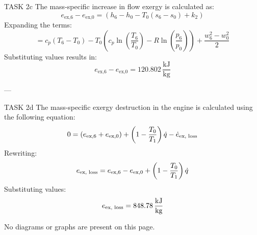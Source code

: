 TASK 2c  
The mass-specific increase in flow exergy is calculated as:  
\[
e_{\text{ex,6}} - e_{\text{ex,0}} = (h_6 - h_0 - T_0(s_6 - s_0) + k_2)
\]  
Expanding the terms:  
\[
= c_p(T_6 - T_0) - T_0 \left( c_p \ln \left( \frac{T_6}{T_0} \right) - R \ln \left( \frac{p_6}{p_0} \right) \right) + \frac{w_6^2 - w_0^2}{2}
\]  
Substituting values results in:  
\[
e_{\text{ex,6}} - e_{\text{ex,0}} = 120.802 \, \frac{\text{kJ}}{\text{kg}}
\]  

---

TASK 2d  
The mass-specific exergy destruction in the engine is calculated using the following equation:  
\[
0 = (e_{\text{ex,6}} + e_{\text{ex,0}}) + \left( 1 - \frac{T_0}{T_1} \right) \dot{q} - \dot{e}_{\text{ex, \text{loss}}}
\]  
Rewriting:  
\[
e_{\text{ex, \text{loss}}} = e_{\text{ex,6}} - e_{\text{ex,0}} + \left( 1 - \frac{T_0}{T_1} \right) \dot{q}
\]  
Substituting values:  
\[
e_{\text{ex, \text{loss}}} = 848.78 \, \frac{\text{kJ}}{\text{kg}}
\]  

No diagrams or graphs are present on this page.